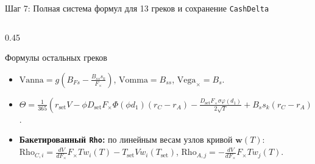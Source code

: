 \documentclass[aspectratio=169, 9pt]{beamer}
\begin{document}
\begin{frame}{Шаг 7: Полная система формул для 13 греков и сохранение \texttt{CashDelta}}
\begin{columns}[T]
\begin{column}{0.45\textwidth}
      \begin{block}{Формулы остальных греков}
        \scriptsize
        \begin{itemize}
          \item $\text{Vanna} = g\!\left(B_{Fs} - \frac{B_{ss} s_k}{F_\times}\right)$, \quad $\text{Vomma} = B_{ss}$, \quad $\text{Vega}_\times = B_s$.
          \item $\Theta = \frac{1}{365}\!\left(r_{\text{set}} V - \phi D_{\text{set}} F_\times \Phi(\phi d_1)(r_C - r_A) - \frac{D_{\text{set}} F_\times \sigma \varphi(d_1)}{2\sqrt{T}} + B_s s_k (r_C - r_A)\right)$.
          \item \textbf{Бакетированный \texttt{Rho}:} по линейным весам узлов кривой $\bm{w}(T)$:
            $\text{Rho}_{C,i} = \frac{dV}{dF_\times} F_\times T w_i(T) - T_{\text{set}} V w_i(T_{\text{set}})$, \quad
            $\text{Rho}_{A,j} = -\frac{dV}{dF_\times} F_\times T w_j(T)$.
        \end{itemize}
      \end{block}
    \end{column}
  \end{columns}
\end{frame}
\end{document}
